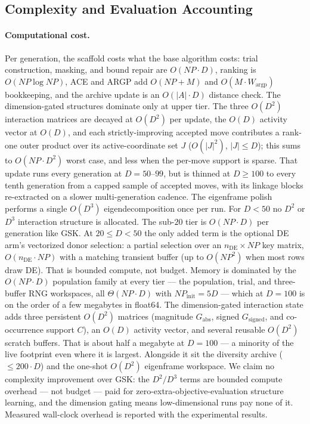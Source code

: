 \subsection{Complexity and Evaluation Accounting}\label{sec:alg:complexity}

\paragraph{Computational cost.}
Per generation, the scaffold costs what the base algorithm costs:
trial construction, masking, and bound repair are $O(NP\cdot D)$,
ranking is $O(NP\log NP)$, ACE and ARGP add $O(NP+M)$ and
$O(M\cdot W_{\text{argp}})$ bookkeeping, and the archive update is an
$O(|A|\cdot D)$ distance check. %
The dimension-gated structures dominate only at upper tier. The three
$O(D^{2})$ interaction matrices are decayed at $O(D^{2})$ per update, the
$O(D)$ activity vector at $O(D)$, and each
strictly-improving accepted move contributes a rank-one outer product over
its active-coordinate set $J$ ($O(|J|^{2})$, $|J|\le D$); this sums to
$O(NP\cdot D^{2})$ worst case, and less when the per-move support is sparse.
That update runs every generation at $D=50$--$99$, but is thinned at $D\ge100$
to every tenth generation from a capped sample of accepted moves, with its
linkage blocks re-extracted on a slower multi-generation cadence. The
eigenframe polish performs a single $O(D^{3})$ eigendecomposition once per
run. %
For $D<50$ no $D^{2}$ or $D^{3}$ interaction structure is allocated. The
sub-$20$ tier is $O(NP\cdot D)$ per generation like GSK. At $20\le D<50$ the
only added term is the optional DE arm's vectorized donor selection: a partial
selection over an $n_{\mathrm{DE}}\times NP$ key matrix, $O(n_{\mathrm{DE}}\cdot NP)$
with a matching transient buffer (up to $O(NP^{2})$ when most rows draw DE).
That is bounded compute, not budget. %
Memory is dominated by the $O(NP\cdot D)$ population family at every tier ---
the population, trial, and three-buffer RNG workspaces, all $\Theta(NP\cdot D)$
with $NP_{\text{init}}=5D$ --- which at $D=100$ is on the order of a few
megabytes in float64.  The dimension-gated interaction state adds three
persistent $O(D^{2})$ matrices (magnitude $G_{\mathrm{abs}}$, signed
$G_{\mathrm{signed}}$, and co-occurrence support $C$), an $O(D)$ activity vector,
and several reusable $O(D^{2})$ scratch buffers. That is about half a megabyte at
$D=100$ --- a minority of the live footprint even where it is largest. Alongside
it sit the diversity archive ($\le 200\cdot D$) and the one-shot $O(D^{2})$
eigenframe workspace. %
We claim no complexity improvement over GSK: the $D^{2}/D^{3}$ terms
are bounded compute overhead --- not budget --- paid for
zero-extra-objective-evaluation structure learning, and the
dimension gating means low-dimensional runs pay none of it.
Measured wall-clock overhead is reported with the experimental
results.

